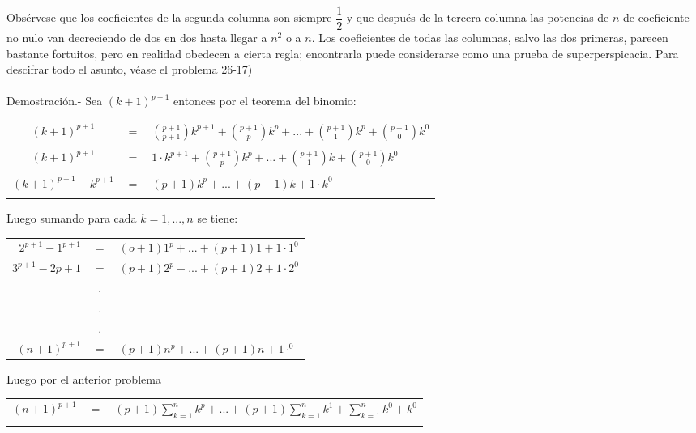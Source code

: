 \begin{enumerate}[\bfseries 1.]
\begin{center}
      \end{center}
      Obsérvese que los coeficientes de la segunda columna son siempre $\dfrac{1}{2}$ y que después de la tercera columna las potencias de $n$ de coeficiente no nulo van decreciendo de dos en dos hasta llegar a $n^2$ o a $n$. Los coeficientes de todas las columnas, salvo las dos primeras, parecen bastante fortuitos, pero en realidad obedecen a cierta regla; encontrarla puede considerarse como una prueba de superperspicacia. Para descifrar todo el asunto, véase el problema 26-17)\\\\
      Demostración.- Sea  $(k+1)^{p+1}$ entonces por el teorema del binomio:
      \begin{center}
	 \begin{tabular}{crl}
	    $(k+1)^{p+1}$&$=$&${p+1 \choose p+1} k^{p+1}+{p+1 \choose p} k^p + ... + {p+1 \choose 1} k^p + {p+1 \choose 0}k^0$\\\\
	    $(k+1)^{p+1}$&$=$&$1 \cdot k^{p+1} + {p+1 \choose p} k^p + ... + {p+1 \choose 1}k + {p+1 \choose 0} k^0$\\\\
	    $(k+1)^{p+1}-k^{p+1}$&$=$&$(p+1)k^p + ... + (p+1)k+1 \cdot k^0$\\\\
	 \end{tabular}
      \end{center}
      Luego sumando para cada $k=1,...,n$ se tiene:
      \begin{center}
	 \begin{tabular}{rcl}
	    $2^{p+1} - 1^{p+1}$&$=$&$(o+1)1^p + ... + (p+1)1 + 1 \cdot 1^0$ \\
	    $3^{p+1} -2{p+1}$&$=$&$(p+1)2^p + ... + (p+1)2+1\cdot 2^0$\\
	    &.&\\
	    &.&\\
	    &.&\\
	    $(n+1)^{p+1}$&$=$&$(p+1)n^{p}+...+(p+1)n + 1 \cdot ^0$\\
	 \end{tabular} 
      \end{center}
      Luego por el anterior problema 
      \begin{center}
	 \begin{tabular}{rcl}
	    $(n+1)^{p+1}$ & $=$ & $(p+1)\sum\limits_{k=1}^n k^p + ... + (p+1)\sum\limits_{k=1}^n k^1 + \sum\limits_{k=1}^n k^0 + k^0$\\\\

\end{tabular}
\end{center}
\end{enumerate}
